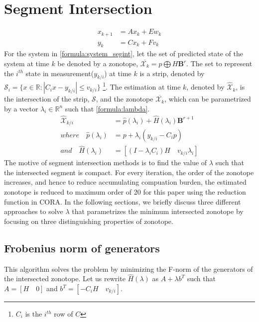 \section{Segment Intersection} 
\begin{equation}
\label{formula:system_segint}
\begin{split}
x_{k+1} &= Ax_k + Ew_k\\
y_k &= Cx_k + Fv_k
\end{split}
\end{equation}
For the system in \eqref{formula:system_segint}, let the set of predicted state of the system at time $k$ be denoted by a zonotope, $\overline{\mathcal{X}_k} = p\bigoplus H \textbf{B}^r$. The set to represent the $i^{th}$ state in measurement($y_{k/i}$) at time $k$ is a strip, denoted by $\mathscr{S}_i = \{x \in \mathbb{R} : |C_i x - y_{k/i}| \leq v_{k/i}\}$ \footnote{$C_i$ is the $i^{th}$ row of $C$}. The estimation at time $k$, denoted by $\mathcal{\hat{X}}_k$, is the intersection of the strip, $\mathscr{S}$, and the zonotope $\overline{\mathcal{X}_k}$, which can be parametrized by a vector $\lambda_i \in \mathbb{R}^n$ such that \eqref{formula:lambda}. 
\begin{equation}
\label{formula:lambda}
\begin{split}
\mathcal{\hat{X}}_{k/i} &= \hat{p}(\lambda_i) + \hat{H}(\lambda_i)\textbf{B}^{r+1}  \\
where \quad \hat{p}(\lambda_i) &= p+ \lambda_i(y_{k/i} - C_ip)\\
and \quad \hat{H}(\lambda_i) &= [(I- \lambda_i C_i) H \quad v_{k/i}\lambda_i ]
\end{split}
\end{equation}
The motive of segment intersection methods is to find the value of $\lambda$ such that the intersected segment is compact. For every iteration, the order of the zonotope increases, and hence to reduce accumulating compuation burden, the estimated zonotope is reduced to maximum order of 20 for this paper using the reduction function in CORA. In the following sections, we briefly discuss three different approaches to solve $\lambda$ that parametrizes the minimum intersected zonotope by focusing on three distinguishing properties of zonotope.

\subsection{Frobenius norm of generators}
This algorithm solves the problem by minimizing the F-norm of the generators of the intersected zonotope. Let us rewrite $\hat{H}(\lambda)$ as $A+ \lambda b^T$ such that $A= [H \quad 0]$ and $b^T = [-C_i H \quad v_{k/i}]$.

